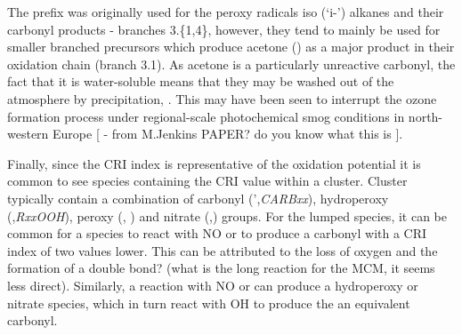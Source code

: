 The \emph{} prefix was originally used for the peroxy radicals iso (`i-') alkanes and their carbonyl products - branches 3.\{1,4\}, however, they tend to mainly be used for smaller branched precursors which produce acetone () as a major product in their oxidation chain (branch 3.1). As acetone is a particularly unreactive carbonyl, the fact that it is water-soluble means that they may be washed out of the atmosphere by precipitation, \citep{acetonerain}. This may have been seen to interrupt the ozone formation process under regional-scale photochemical smog conditions in north-western Europe [ - from M.Jenkins PAPER? do you know what this is ].

Finally, since the CRI index is representative of the oxidation potential it is common to see species containing the CRI value within a cluster. Cluster typically contain a combination of carbonyl (',\emph{CARBxx}), hydroperoxy (,\emph{RxxOOH}), peroxy (, \emph{}) and nitrate (,\emph{}) groups. For the lumped species, it can be common for a  species to react with NO or  to produce a carbonyl with a CRI index of two values lower. This can be attributed to the loss of oxygen and the formation of a double bond? (what is the long reaction for the MCM, it seems less direct). Similarly, a reaction with NO or  can produce a hydroperoxy or nitrate species, which in turn react with OH to produce the an equivalent carbonyl.


% 
% 
% 
% 
% 



